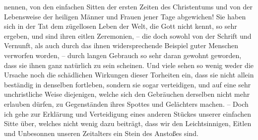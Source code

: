 nennen, von den einfachen Sitten der ersten Zeiten des Christentums und von
der Lebensweise der heiligen Männer und Frauen jener Tage abgewichen! Sie haben
sich in der Tat dem zügellosen Leben der Welt, die Gott nicht kennt, so sehr
ergeben, und sind ihren eitlen Zeremonien, -- die doch sowohl von der Schrift
und Vernunft, als auch durch das ihnen widersprechende Beispiel guter Menschen
verworfen worden, -- durch langen Gebrauch so sehr daran gewohnt geworden, dass
sie
ihnen ganz natürlich zu sein scheinen. Und viele sehen so wenig weder die
Ursache noch die schädlichen Wirkungen dieser Torheiten ein, dass sie nicht
allein beständig in denselben fortleben, sondern sie sogar verteidigen,
und auf eine sehr unchristliche Weise diejenigen, welche sich den Gebräuchen
derselben nicht mehr erlauben dürfen, zu Gegenständen ihres Spottes und
Gelächters machen. -- Doch ich gehe zur Erklärung und Verteidigung eines anderen
Stückes unserer einfachen Sitte über, welches nicht wenig dazu beiträgt, dass
wir
den Leichtsinnigen, Eitlen und Unbesonnen unseren Zeitalters ein Stein des
Anstoßes sind.




